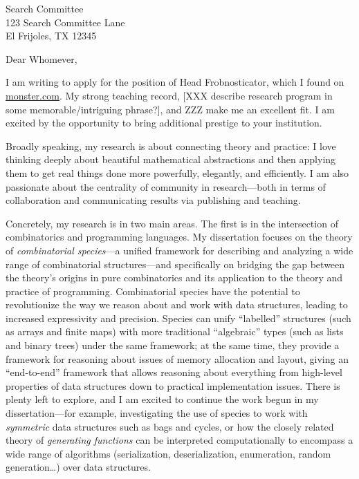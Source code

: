 \documentclass{letter}
\newif\ifresearch
\def\addressee{Whomever}
\def\thereaddress{Search Committee \\ 123 Search Committee Lane \\ El
  Frijoles, TX 12345}
\def\position{the position of Head Frobnosticator}
\def\foundon{I found on \url{monster.com}}
\def\opportunity{I am excited by the opportunity to bring additional
  prestige to your institution.}
\begin{document}
\begin{letter}{\thereaddress}

\opening{Dear \addressee,}

I am writing to apply for \position, which \foundon.  My strong
teaching record, [XXX describe research program in some
memorable/intriguing phrase?], and ZZZ make me an excellent
fit. \opportunity

\ifresearch
Broadly speaking, my research is about connecting theory and practice:
I love thinking deeply about beautiful mathematical abstractions and
then applying them to get real things done more powerfully, elegantly,
and efficiently.  I am also passionate about the centrality of
community in research---both in terms of collaboration and
communicating results via publishing and teaching.

Concretely, my research is in two main areas. The first is in the
intersection of combinatorics and programming languages.  My
dissertation focuses on the theory of \emph{combinatorial species}---a
unified framework for describing and analyzing a wide range of
combinatorial structures---and specifically on bridging the gap
between the theory's origins in pure combinatorics and its application
to the theory and practice of programming.  Combinatorial species have
the potential to revolutionize the way we reason about and work with
data structures, leading to increased expressivity and precision.
Species can unify ``labelled'' structures (such as arrays and finite
maps) with more traditional ``algebraic'' types (such as lists and
binary trees) under the same framework; at the same time, they provide
a framework for reasoning about issues of memory allocation and
layout, giving an ``end-to-end'' framework that allows reasoning about
everything from high-level properties of data structures down to
practical implementation issues.  There is plenty left to explore, and
I am excited to continue the work begun in my dissertation---for
example, investigating the use of species to work with
\emph{symmetric} data structures such as bags and cycles, or how the
closely related theory of \emph{generating functions} can be
interpreted computationally to encompass a wide range of algorithms
(serialization, deserialization, enumeration, random generation\dots)
over data structures.


\end{letter}
\end{document}
